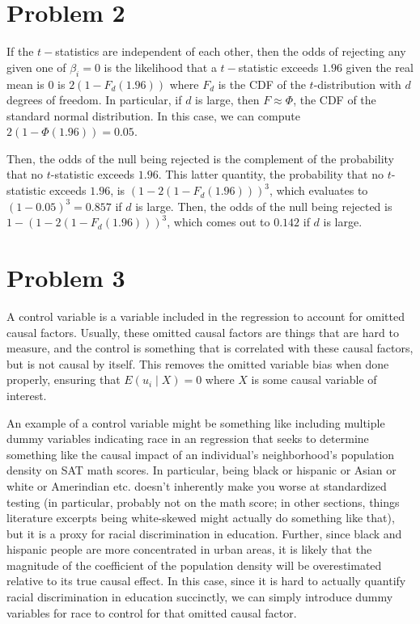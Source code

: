 \documentclass[12pt,letterpaper]{article}
\theoremstyle{definition}
\begin{document}
\section*{Problem 2}

If the $t-$statistics are independent of each other, then the odds of rejecting any given one of $\beta_{i} = 0$ is the likelihood that a $t-$statistic exceeds $1.96$ given the real mean is $0$ is $2(1 - F_{d}(1.96))$ where $F_{d}$ is the CDF of the $t$-distribution with $d$ degrees of freedom. In particular, if $d$ is large, then $F \approx \Phi$, the CDF of the standard normal distribution. In this case, we can compute $2(1 - \Phi(1.96)) = 0.05$.

Then, the odds of the null being rejected is the complement of the probability that no $t$-statistic exceeds $1.96$. This latter quantity, the probability that no $t$-statistic exceeds $1.96$, is $(1 - 2(1-F_{d}(1.96)))^{3}$, which evaluates to $(1 - 0.05)^{3} = 0.857$ if $d$ is large. Then, the odds of the null being rejected is $1 - (1 - 2(1-F_{d}(1.96)))^{3}$, which comes out to $0.142$ if $d$ is large.

\section*{Problem 3}

A control variable is a variable included in the regression to account for omitted causal factors. Usually, these omitted causal factors are things that are hard to measure, and the control is something that is correlated with these causal factors, but is not causal by itself. This removes the omitted variable bias when done properly, ensuring that $E(u_{i} \mid X) = 0$ where $X$ is some causal variable of interest.

An example of a control variable might be something like including multiple dummy variables indicating race in an regression that seeks to determine something like the causal impact of an individual's neighborhood's population density on SAT math scores. In particular, being black or hispanic or Asian or white or Amerindian etc. doesn't inherently make you worse at standardized testing (in particular, probably not on the math score; in other sections, things literature excerpts being white-skewed might actually do something like that), but it is a proxy for racial discrimination in education. Further, since black and hispanic people are more concentrated in urban areas, it is likely that the magnitude of the coefficient of the population density will be overestimated relative to its true causal effect. In this case, since it is hard to actually quantify racial discrimination in education succinctly, we can simply introduce dummy variables for race to control for that omitted causal factor.
\end{document}
